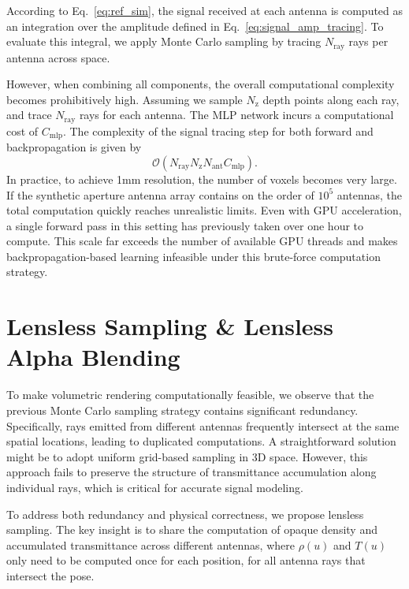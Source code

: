 According to Eq.~\ref{eq:ref_sim}, the signal received at each antenna is computed as an integration over the amplitude defined in Eq.~\ref{eq:signal_amp_tracing}.
To evaluate this integral, we apply Monte Carlo sampling by tracing \( N_{\text{ray}} \) rays per antenna across space.

However, when combining all components, the overall computational complexity becomes prohibitively high.
Assuming we sample \( N_{\text{z}} \) depth points along each ray, and trace \( N_{\text{ray}} \) rays for each antenna.
The MLP network incurs a computational cost of \( C_{\text{mlp}} \).
The complexity of the signal tracing step for both forward and backpropagation is given by
\begin{equation}
\label{eq:lens_sample_complexity}
\mathcal{O}(N_{\text{ray}} N_{\text{z}} N_{\text{ant}}C_{\text{mlp}}).
\end{equation}
In practice, to achieve 1mm resolution,
the number of voxels becomes very large.
If the synthetic aperture antenna array contains on the order of \( 10^5 \) antennas, the total computation quickly reaches unrealistic limits.
Even with GPU acceleration, a single forward pass in this setting has previously taken over one hour to compute.
This scale far exceeds the number of available GPU threads and makes backpropagation-based learning infeasible under this brute-force computation strategy.

\section{Lensless Sampling \& Lensless Alpha Blending}
\label{sec:lens-less-sampling}
To make volumetric rendering computationally feasible,
we observe that the previous Monte Carlo sampling strategy contains significant redundancy.
Specifically, rays emitted from different antennas frequently intersect at the same spatial locations, leading to duplicated computations.
A straightforward solution might be to adopt uniform grid-based sampling in 3D space.
However, this approach fails to preserve the structure of transmittance accumulation along individual rays, which is critical for accurate signal modeling.

To address both redundancy and physical correctness, we propose lensless sampling. The key insight is to share the computation of opaque density and accumulated transmittance across different antennas, where \(\rho(u)\) and \(T(u)\) only need to be computed once for each position, for all antenna rays that intersect the pose.

